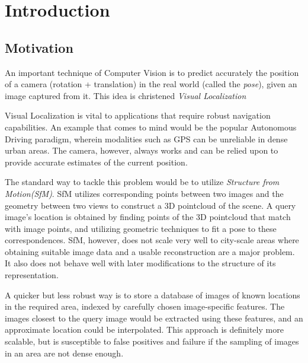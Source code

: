 

\chapter{Introduction}
\section{Motivation}
An important technique of Computer Vision is to predict accurately the position of a camera (rotation + translation) in the real world (called the \emph{pose}), given an image captured from it. This idea is christened \emph{Visual Localization} 

Visual Localization is vital to applications that require robust navigation capabilities. An example that comes to mind would be the popular Autonomous Driving paradigm, wherein modalities such as GPS can be unreliable in dense urban areas. The camera, however, always works and can be relied upon to provide accurate estimates of the current position. 

The standard way to tackle this problem would be to utilize \emph{Structure from Motion(SfM)}. SfM utilizes corresponding points between two images and the geometry between two views to construct a 3D pointcloud of the scene. A query image's location is obtained by finding points of the 3D pointcloud that match with image points, and utilizing geometric techniques to fit a pose to these correspondences. SfM, however, does not scale very well to city-scale areas where obtaining suitable image data and a usable reconstruction are a major problem. It also does not behave well with later modifications to the structure of its representation.

A quicker but less robust way is to store a database of images of known locations in the required area, indexed by carefully chosen image-specific features. The images closest to the query image would be extracted using these features, and an approximate location could be interpolated. This approach is definitely more scalable, but is susceptible to false positives and failure if the sampling of images in an area are not dense enough. 

